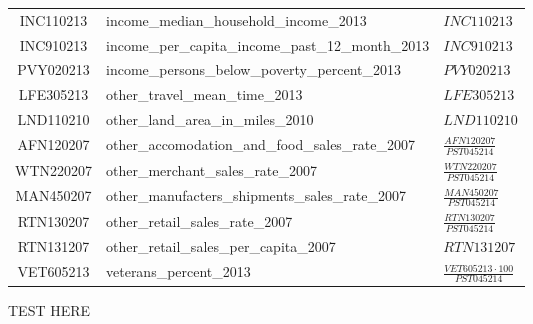 \begin{landscape}
{\begin{tabularx}{\linewidth}[Httt]{cXX}
	INC110213 & income\_median\_household\_income\_2013  & \( \mathit{INC110213} \) \\
	INC910213 & income\_per\_capita\_income\_past\_12\_month\_2013 &  \( \mathit{INC910213} \)                    \\
	PVY020213 & income\_persons\_below\_poverty\_percent\_2013 &  \( \mathit{PVY020213} \) \\
	LFE305213 & other\_travel\_mean\_time\_2013          &  \( \mathit{LFE305213} \) \\
	LND110210 & other\_land\_area\_in\_miles\_2010        &  \( \mathit{LND110210} \) \\
	AFN120207 & other\_accomodation\_and\_food\_sales\_rate\_2007    & \( \frac{\mathit{AFN120207}}{\mathit{PST045214}} \) \\
	WTN220207 & other\_merchant\_sales\_rate\_2007 & \( \frac{\mathit{WTN220207}}{\mathit{PST045214}} \) \\
	MAN450207 & other\_manufacters\_shipments\_sales\_rate\_2007 & \( \frac{\mathit{MAN450207}}{\mathit{PST045214}} \) \\
	RTN130207 & other\_retail\_sales\_rate\_2007 & \( \frac{\mathit{RTN130207}}{\mathit{PST045214}} \) \\
	RTN131207 & other\_retail\_sales\_per\_capita\_2007 &  \( \mathit{RTN131207} \) \\
	VET605213 & veterans\_percent\_2013 & \( \frac{\mathit{VET605213} \cdot 100}{\mathit{PST045214}} \) \\
	\bottomrule
\end{tabularx}
}
\end{landscape}
\pagestyle{headings}

TEST HERE